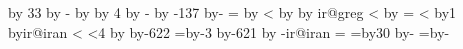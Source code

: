 {{\multiply\ir@temptwo by 33\relax
\advance\ir@tempthree by -\ir@temptwo
\ifnum{}\advance\ir@temp by\@ne\fi %
\divide\ir@tempthree by 4\relax     %
\advance\ir@temp by -\ir@tempthree
\advance\ir@temp by -137            %
\advance\ir@temptwo by-\ir@temp     %
\chardef\ir@irani\ir@temptwo
\chardef{}
\ifir@kabiseh\chardef{}\else\chardef{}\fi
\chardef{}\chardef{}%
\chardef{}\chardef{}%
\chardef{}\chardef{}%
\chardef{}\chardef{}%
\chardef{}\chardef{}%
%
\relax
{}\relax
\ir@mminusone=\ir@m
\advance\ir@mminusone by\m@ne\relax
%
\relax
\ifnum\ir@i<\ir@mminusone
  \loop
  \advance \ir@i by\@ne\relax
  \advance\ir@dn by \csname ir@greg\romannumeral\ir@i\endcsname
  \ifnum\ir@i<\ir@mminusone\repeat
\fi
\advance \ir@dn by\ir@d
%
\relax
\ir@sn=\ir@irani
\ifnum\ir@sn<\ir@dn
  \loop
  \advance\ir@i by1\relax
  \advance\ir@sn by\csname ir@iran\romannumeral\ir@i\endcsname
  \ifnum\ir@sn<\ir@dn\repeat
\fi
\ifnum\ir@i<4%
   \advance\ir@m by\ir@i
   \advance\ir@y by-622\relax
\else
   \ir@m=\ir@i \advance\ir@m by-3\relax
   \advance\ir@y by-621\relax
\fi
\advance\ir@sn by -\csname ir@iran\romannumeral\ir@i%
\endcsname
\ifnum\ir@i =\@ne
  \ir@d=\ir@dn \advance\ir@d by30 \advance\ir@d by-\ir@irani
\else
  \ir@d=\ir@dn \advance\ir@d by-\ir@sn
\fi
%
\xdef\ir@@d{\the\ir@d}%
\xdef\ir@@m{\the\ir@m}%
\xdef\ir@@y{\the\ir@y}%
}%
\let\ir@d\ir@@d
\let\ir@m\ir@@m
\let\ir@y\ir@@y
}

\endinput
